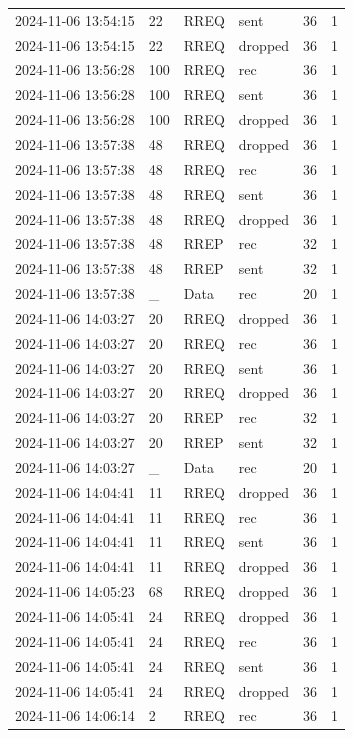 \documentclass[]{nsm-thesis}
\begin{document}
\begin{longtable}{llllll}
2024-11-06 13:54:15 & 22 & RREQ & sent & 36 & 1 \\
2024-11-06 13:54:15 & 22 & RREQ & dropped & 36 & 1 \\
2024-11-06 13:56:28 & 100 & RREQ & rec & 36 & 1 \\
2024-11-06 13:56:28 & 100 & RREQ & sent & 36 & 1 \\
2024-11-06 13:56:28 & 100 & RREQ & dropped & 36 & 1 \\
2024-11-06 13:57:38 & 48 & RREQ & dropped & 36 & 1 \\
2024-11-06 13:57:38 & 48 & RREQ & rec & 36 & 1 \\
2024-11-06 13:57:38 & 48 & RREQ & sent & 36 & 1 \\
2024-11-06 13:57:38 & 48 & RREQ & dropped & 36 & 1 \\
2024-11-06 13:57:38 & 48 & RREP & rec & 32 & 1 \\
2024-11-06 13:57:38 & 48 & RREP & sent & 32 & 1 \\
2024-11-06 13:57:38 & _ & Data & rec & 20 & 1 \\
2024-11-06 14:03:27 & 20 & RREQ & dropped & 36 & 1 \\
2024-11-06 14:03:27 & 20 & RREQ & rec & 36 & 1 \\
2024-11-06 14:03:27 & 20 & RREQ & sent & 36 & 1 \\
2024-11-06 14:03:27 & 20 & RREQ & dropped & 36 & 1 \\
2024-11-06 14:03:27 & 20 & RREP & rec & 32 & 1 \\
2024-11-06 14:03:27 & 20 & RREP & sent & 32 & 1 \\
2024-11-06 14:03:27 & _ & Data & rec & 20 & 1 \\
2024-11-06 14:04:41 & 11 & RREQ & dropped & 36 & 1 \\
2024-11-06 14:04:41 & 11 & RREQ & rec & 36 & 1 \\
2024-11-06 14:04:41 & 11 & RREQ & sent & 36 & 1 \\
2024-11-06 14:04:41 & 11 & RREQ & dropped & 36 & 1 \\
2024-11-06 14:05:23 & 68 & RREQ & dropped & 36 & 1 \\
2024-11-06 14:05:41 & 24 & RREQ & dropped & 36 & 1 \\
2024-11-06 14:05:41 & 24 & RREQ & rec & 36 & 1 \\
2024-11-06 14:05:41 & 24 & RREQ & sent & 36 & 1 \\
2024-11-06 14:05:41 & 24 & RREQ & dropped & 36 & 1 \\
2024-11-06 14:06:14 & 2 & RREQ & rec & 36 & 1 \\

\end{longtable}
\end{document}
